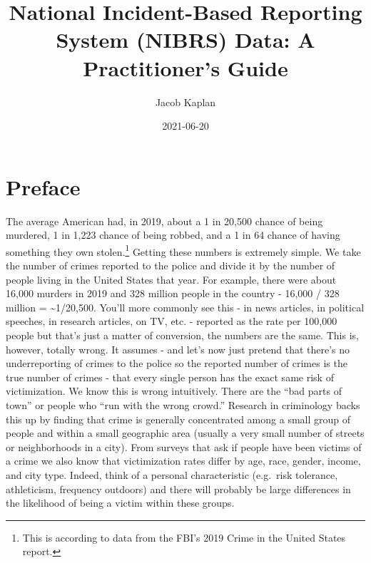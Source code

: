 \documentclass[
  12pt,
  openany]{book}
\title{National Incident-Based Reporting System (NIBRS) Data: A Practitioner's Guide}
\author{Jacob Kaplan}
\date{2021-06-20}
\begin{document}
\maketitle

{
\hypersetup{linkcolor=}
\setcounter{tocdepth}{3}
\tableofcontents
}
\listoftables
\listoffigures
{}
\hypertarget{preface}{%
\chapter{Preface}\label{preface}}

The average American had, in 2019, about a 1 in 20,500 chance of being murdered, 1 in 1,223 chance of being robbed, and a 1 in 64 chance of having something they own stolen.\footnote{This is according to data from the FBI's 2019 Crime in the United States report.} Getting these numbers is extremely simple. We take the number of crimes reported to the police and divide it by the number of people living in the United States that year. For example, there were about 16,000 murders in 2019 and 328 million people in the country - 16,000 / 328 million = \textasciitilde1/20,500. You'll more commonly see this - in news articles, in political speeches, in research articles, on TV, etc. - reported as the rate per 100,000 people but that's just a matter of conversion, the numbers are the same. This is, however, totally wrong. It assumes - and let's now just pretend that there's no underreporting of crimes to the police so the reported number of crimes is the true number of crimes - that every single person has the exact same risk of victimization. We know this is wrong intuitively. There are the ``bad parts of town'' or people who ``run with the wrong crowd.'' Research in criminology backs this up by finding that crime is generally concentrated among a small group of people and within a small geographic area (usually a very small number of streets or neighborhoods in a city). From surveys that ask if people have been victims of a crime we also know that victimization rates differ by age, race, gender, income, and city type. Indeed, think of a personal characteristic (e.g.~risk tolerance, athleticism, frequency outdoors) and there will probably be large differences in the likelihood of being a victim within these groups.
\end{document}
